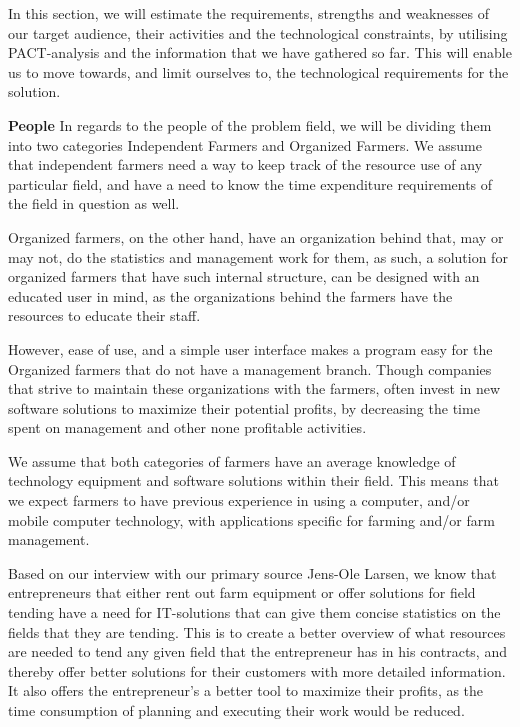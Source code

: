 In this section, we will estimate the requirements, strengths and weaknesses of our target audience, their activities and the technological constraints, by utilising PACT-analysis and the information that we have gathered so far. This will enable us to move towards, and limit ourselves to, the technological requirements for the solution.

\textbf{People}\newline
In regards to the people of the problem field, we will be dividing them into two categories Independent Farmers and Organized Farmers. We assume that independent farmers need a way to keep track of the resource use of any particular field, and have a need to know the time expenditure requirements of the field in question as well. 

Organized farmers, on the other hand, have an organization behind that, may or may not, do the statistics and management work for them, as such, a solution for organized farmers that have such internal structure, can be designed with an educated user in mind, as the organizations behind the farmers have the resources to educate their staff.

However, ease of use, and a simple user interface makes a program easy for the Organized farmers that do not have a management branch. Though companies that strive to maintain these organizations with the farmers, often invest in new software solutions to maximize their potential profits, by decreasing the time spent on management and other none profitable activities.

We assume that both categories of farmers have an average knowledge of technology equipment and software solutions within their field. This means that we expect farmers to have previous experience in using a computer, and/or mobile computer technology, with applications specific for farming and/or farm management.

Based on our interview with our primary source Jens-Ole Larsen, we know that entrepreneurs that either rent out farm equipment or offer solutions for field tending have a need for IT-solutions that can give them concise statistics on the fields that they are tending. This is to create a better overview of what resources are needed to tend any given field that the entrepreneur has in his contracts, and thereby offer better solutions for their customers with more detailed information. It also offers the entrepreneur's a better tool to maximize their profits, as the time consumption of planning and executing their work would be reduced.  

